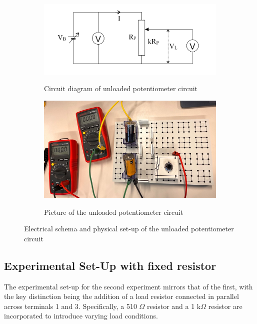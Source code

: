 \documentclass[a4paper]{article}
\begin{document}
\begin{figure}[!h]
    \centering
    \begin{subfigure}{.5\textwidth}
        \centering
        \includegraphics[width=0.8\linewidth]{Unloaded pot circuit.png}
        \label{fig:2a}
        \caption{Circuit diagram of unloaded potentiometer circuit\cite{report}}   
    \end{subfigure}%
    \begin{subfigure}{.5\textwidth}
        \centering
        \includegraphics[width = 0.8\linewidth]{unloaded pot picture.png}
        \label{fig2:b}
        \caption{Picture of the unloaded potentiometer circuit}
    \end{subfigure}
    \caption{Electrical schema and physical set-up of the unloaded potentiometer circuit}
\end{figure}
\subsection{Experimental Set-Up with fixed resistor}
The experimental set-up for the second experiment mirrors that of the first, 
with the key distinction being the addition of a load resistor connected in parallel across terminals 1 and 3.
Specifically, a 510 $\Omega$ resistor and a 1 k$\Omega$ resistor are incorporated to introduce varying load conditions.
\end{document}
